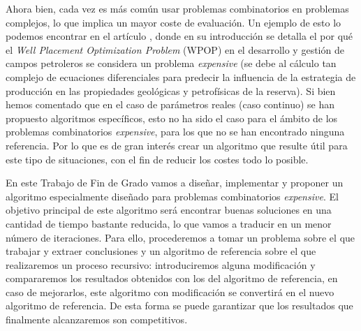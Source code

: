 Ahora bien, cada vez es más común usar problemas combinatorios en problemas complejos, lo que implica un mayor coste de evaluación. 
Un ejemplo de esto lo podemos encontrar en el artículo \parencite{demoraesDiversityPreservationMethod2022}, donde en su introducción se detalla el por qué el \textit{Well Placement Optimization Problem} (WPOP) en el desarrollo y gestión de campos petroleros se considera un problema \textit{expensive} (se debe al cálculo tan complejo de ecuaciones diferenciales para predecir la influencia de la estrategia de producción  en las propiedades geológicas y petrofísicas de la reserva). 
Si bien hemos comentado que en el caso de parámetros reales (caso continuo) se han propuesto algoritmos específicos, esto no ha sido el caso para el ámbito de los problemas combinatorios \textit{expensive}, para los que no se han encontrado ninguna referencia. 
Por lo que es de gran interés crear un algoritmo que resulte útil para este tipo de situaciones, con el fin de reducir los costes todo lo posible. 

En este Trabajo de Fin de Grado vamos a diseñar, implementar y proponer un algoritmo especialmente diseñado para problemas combinatorios \textit{expensive}. 
El objetivo principal de este algoritmo será encontrar buenas soluciones en una cantidad de tiempo bastante reducida, lo que vamos a traducir en un menor número de iteraciones. 
Para ello, procederemos a tomar un problema sobre el que trabajar y extraer conclusiones y un algoritmo de referencia sobre el que realizaremos un proceso recursivo: introduciremos alguna modificación y compararemos los resultados obtenidos con los del algoritmo de referencia, en caso de mejorarlos, este algoritmo con modificación se convertirá en el nuevo algoritmo de referencia. 
De esta forma se puede garantizar que los resultados que finalmente alcanzaremos son competitivos. 